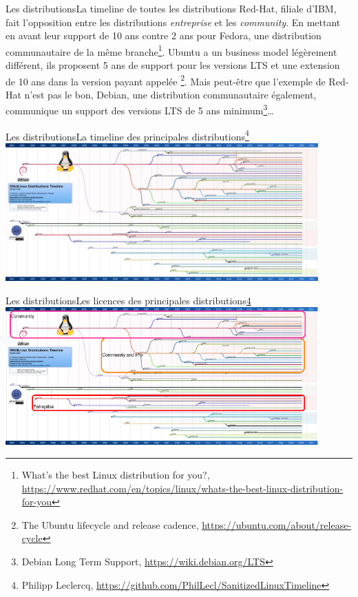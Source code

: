 \documentclass{beamer}
\begin{document}
    \begin{frame}{Les distributions}{La timeline de toutes les distributions}
        Red-Hat, filiale d'IBM, fait l'opposition entre les distributions \textit{entreprise} et les \textit{community}.
        En mettant en avant leur support de 10 ans contre 2 ans pour Fedora, une distribution communautaire de la même branche\footnote{What's the best Linux distribution for you?, \url{https://www.redhat.com/en/topics/linux/whats-the-best-linux-distribution-for-you}}.
        \bigbreak
        Ubuntu a un business model légèrement différent, ils proposent 5 ans de support pour les versions LTS et une extension de 10 ans dans la version payant appelée \footnote{The Ubuntu lifecycle and release cadence, \url{https://ubuntu.com/about/release-cycle}}.
        \bigbreak
        Mais peut-être que l'exemple de Red-Hat n'est pas le bon, Debian, une distribution communautaire également, communique un support des versions LTS de 5 ans minimum\footnote{Debian Long Term Support, \url{https://wiki.debian.org/LTS}}\ldots
    \end{frame}

    \begin{frame}{Les distributions}{La timeline des principales distributions\footnote{\label{main-distribution}Philipp Leclercq, \url{https://github.com/PhilLecl/SanitizedLinuxTimeline}}}
        \centering
        \includegraphics[width=12cm]{image/linux-main-distro-timeline}
    \end{frame}

    \begin{frame}{Les distributions}{Les licences des principales distributions\cref{main-distribution}}
        \centering
        \includegraphics[width=12cm]{image/main-distro-license.drawio}
    \end{frame}
\end{document}
